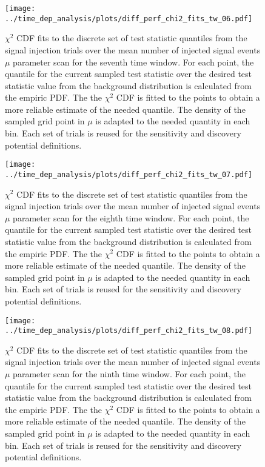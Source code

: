 \begin{figure}[H]
  \centering
  \texttt{[image: ../time\_dep\_analysis/plots/diff\_perf\_chi2\_fits\_tw\_06.pdf]}
  \caption[$\chi^2$ CDF fits for the 7th time window differential performance]{
     $\chi^2$ CDF fits to the discrete set of test statistic quantiles from the signal injection trials over the mean number of injected signal events $\mu$ parameter scan for the seventh time window.
     For each point, the quantile for the current sampled test statistic over the desired test statistic value from the background distribution is calculated from the empiric PDF.
     The the $\chi^2$ CDF is fitted to the points to obtain a more reliable estimate of the needed quantile.
     The density of the sampled grid point in $\mu$ is adapted to the needed quantity in each bin.
     Each set of trials is reused for the sensitivity and discovery potential definitions.
  }
  \label{fig:diff_perf_chi2_fits_tw_06}
\end{figure}
\begin{figure}[H]
  \centering
  \texttt{[image: ../time\_dep\_analysis/plots/diff\_perf\_chi2\_fits\_tw\_07.pdf]}
  \caption[$\chi^2$ CDF fits for the 8th time window differential performance]{
     $\chi^2$ CDF fits to the discrete set of test statistic quantiles from the signal injection trials over the mean number of injected signal events $\mu$ parameter scan for the eighth time window.
     For each point, the quantile for the current sampled test statistic over the desired test statistic value from the background distribution is calculated from the empiric PDF.
     The the $\chi^2$ CDF is fitted to the points to obtain a more reliable estimate of the needed quantile.
     The density of the sampled grid point in $\mu$ is adapted to the needed quantity in each bin.
     Each set of trials is reused for the sensitivity and discovery potential definitions.
  }
  \label{fig:diff_perf_chi2_fits_tw_07}
\end{figure}
\begin{figure}[H]
  \centering
  \texttt{[image: ../time\_dep\_analysis/plots/diff\_perf\_chi2\_fits\_tw\_08.pdf]}
  \caption[$\chi^2$ CDF fits for the 9th time window differential performance]{
     $\chi^2$ CDF fits to the discrete set of test statistic quantiles from the signal injection trials over the mean number of injected signal events $\mu$ parameter scan for the ninth time window.
     For each point, the quantile for the current sampled test statistic over the desired test statistic value from the background distribution is calculated from the empiric PDF.
     The the $\chi^2$ CDF is fitted to the points to obtain a more reliable estimate of the needed quantile.
     The density of the sampled grid point in $\mu$ is adapted to the needed quantity in each bin.
     Each set of trials is reused for the sensitivity and discovery potential definitions.
  }
  \label{fig:diff_perf_chi2_fits_tw_08}
\end{figure}
